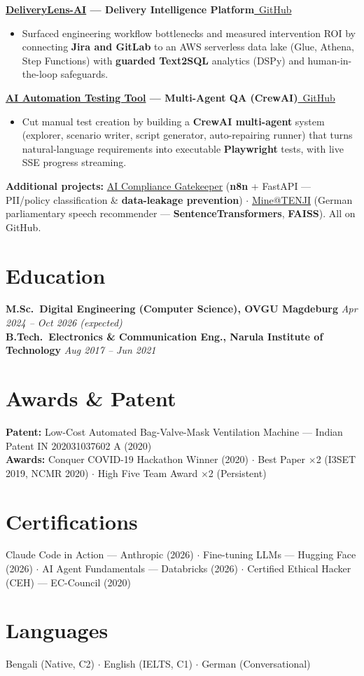 \documentclass[10pt,a4paper]{article}
\newcommand{\gh}[1]{\href{https://github.com/sandipanseal/#1}{\faGithub\ GitHub}}
\newcommand{\entry}[2]{\vspace{3pt}\textbf{#1}\hfill #2\par}
\begin{document}
\entry{\href{https://github.com/sandipanseal/DeliveryLens-AI}{DeliveryLens-AI} --- Delivery Intelligence Platform}{\gh{DeliveryLens-AI}}
\begin{itemize}
\item Surfaced engineering workflow bottlenecks and measured intervention ROI by connecting \textbf{Jira and GitLab} to an AWS serverless data lake (Glue, Athena, Step Functions) with \textbf{guarded Text2SQL} analytics (DSPy) and human-in-the-loop safeguards.
\end{itemize}
\entry{\href{https://github.com/sandipanseal/AI-Automation-Testing-Tool-using-CrewAi}{AI Automation Testing Tool} --- Multi-Agent QA (CrewAI)}{\gh{AI-Automation-Testing-Tool-using-CrewAi}}
\begin{itemize}
\item Cut manual test creation by building a \textbf{CrewAI multi-agent} system (explorer, scenario writer, script generator, auto-repairing runner) that turns natural-language requirements into executable \textbf{Playwright} tests, with live SSE progress streaming.
\end{itemize}
\textbf{Additional projects:} \href{https://github.com/sandipanseal/AI-Compliance-Gatekeeper-n8n}{AI Compliance Gatekeeper} (\textbf{n8n} + FastAPI --- PII/policy classification \& \textbf{data-leakage prevention}) $\cdot$ \href{https://github.com/sandipanseal/Mine-TENJI-Integrating-Speech-Recommendation-into-Legal-Search}{Mine@TENJI} (German parliamentary speech recommender --- \textbf{SentenceTransformers}, \textbf{FAISS}). All on GitHub.

\section*{Education}
\textbf{M.Sc.\ Digital Engineering (Computer Science), OVGU Magdeburg} \hfill \textit{Apr 2024 -- Oct 2026 (expected)}\\
\textbf{B.Tech.\ Electronics \& Communication Eng., Narula Institute of Technology} \hfill \textit{Aug 2017 -- Jun 2021}

\section*{Awards \& Patent}
\textbf{Patent:} Low-Cost Automated Bag-Valve-Mask Ventilation Machine --- Indian Patent IN 202031037602 A (2020)\\
\textbf{Awards:} Conquer COVID-19 Hackathon Winner (2020) $\cdot$ Best Paper $\times$2 (I3SET 2019, NCMR 2020) $\cdot$ High Five Team Award $\times$2 (Persistent)

\section*{Certifications}
Claude Code in Action --- Anthropic (2026) $\cdot$ Fine-tuning LLMs --- Hugging Face (2026) $\cdot$ AI Agent Fundamentals --- Databricks (2026) $\cdot$ Certified Ethical Hacker (CEH) --- EC-Council (2020)

\section*{Languages}
Bengali (Native, C2) $\cdot$ English (IELTS, C1) $\cdot$ German (Conversational)
\end{document}
